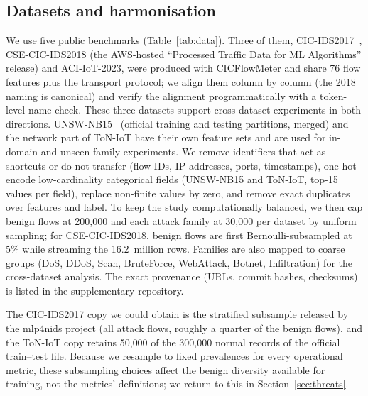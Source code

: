 \subsection{Datasets and harmonisation}\label{sec:data}
We use five public benchmarks (Table~\ref{tab:data}). Three of them, CIC-IDS2017~\cite{sharafaldin2018toward}, CSE-CIC-IDS2018 (the AWS-hosted ``Processed Traffic Data for ML Algorithms'' release) and ACI-IoT-2023, were produced with CICFlowMeter and share 76 flow features plus the transport protocol; we align them column by column (the 2018 naming is canonical) and verify the alignment programmatically with a token-level name check. These three datasets support cross-dataset experiments in both directions. UNSW-NB15~\cite{moustafa2015unsw} (official training and testing partitions, merged) and the network part of ToN-IoT have their own feature sets and are used for in-domain and unseen-family experiments. We remove identifiers that act as shortcuts or do not transfer (flow IDs, IP addresses, ports, timestamps), one-hot encode low-cardinality categorical fields (UNSW-NB15 and ToN-IoT, top-15 values per field), replace non-finite values by zero, and remove exact duplicates over features and label. To keep the study computationally balanced, we then cap benign flows at 200{,}000 and each attack family at 30{,}000 per dataset by uniform sampling; for CSE-CIC-IDS2018, benign flows are first Bernoulli-subsampled at 5\% while streaming the 16.2~million rows. Families are also mapped to coarse groups (DoS, DDoS, Scan, BruteForce, WebAttack, Botnet, Infiltration) for the cross-dataset analysis. The exact provenance (URLs, commit hashes, checksums) is listed in the supplementary repository.

The CIC-IDS2017 copy we could obtain is the stratified subsample released by the mlp4nids project (all attack flows, roughly a quarter of the benign flows), and the ToN-IoT copy retains 50{,}000 of the 300{,}000 normal records of the official train--test file. Because we resample to fixed prevalences for every operational metric, these subsampling choices affect the benign diversity available for training, not the metrics' definitions; we return to this in Section~\ref{sec:threats}.

